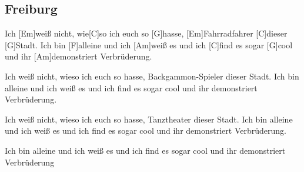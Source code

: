 \subsection*{Freiburg   }



\begin{guitar}
Ich [Em]weiß nicht, wie[C]so ich euch so [G]hasse,
[Em]Fahrradfahrer [C]dieser [G]Stadt.
Ich bin [F]alleine und ich [Am]weiß es
und ich [C]find es sogar [G]cool
und ihr [Am]demonstriert Verbrüderung.

Ich weiß nicht, wieso ich euch so hasse,
Backgammon-Spieler dieser Stadt.
Ich bin alleine und ich weiß es
und ich find es sogar cool
und ihr demonstriert Verbrüderung.

Ich weiß nicht, wieso ich euch so hasse,
Tanztheater dieser Stadt.
Ich bin alleine und ich weiß es
und ich find es sogar cool
und ihr demonstriert Verbrüderung.

Ich bin alleine und ich weiß es
und ich find es sogar cool
und ihr demonstriert Verbrüderung
\end{guitar}
